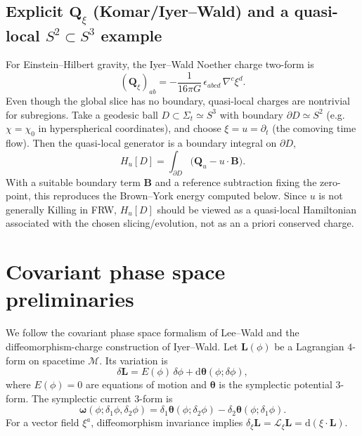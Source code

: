 \documentclass[
  reprint,
  amsmath,amssymb,
  aps,
  prd,
  superscriptaddress,
  nofootinbib,
  longbibliography
]{revtex4-2}
\newcommand{\dd}{\mathrm{d}}
\newcommand{\M}{\mathcal{M}}
\newcommand{\Lie}{\mathcal{L}}
\newcommand{\Lform}{\bm{L}}
\newcommand{\tht}{\bm{\theta}}
\newcommand{\om}{\bm{\omega}}
\newcommand{\Q}{\bm{Q}}
\newcommand{\Bnd}{\bm{B}}
\begin{document}
\subsection{Explicit \texorpdfstring{$\Q_\xi$}{Q_xi} (Komar/Iyer--Wald) and a quasi-local \texorpdfstring{$S^2\subset S^3$}{S2 subset S3} example}
For Einstein--Hilbert gravity, the Iyer--Wald Noether charge two-form is
\begin{equation}
(\Q_\xi)_{ab}=-\frac{1}{16\pi G}\,\epsilon_{abcd}\,\nabla^c\xi^d.
\label{eq:QEH}
\end{equation}
Even though the global slice has no boundary, quasi-local charges are nontrivial for subregions.
Take a geodesic ball $D\subset\Sigma_t\simeq S^{3}$ with boundary $\partial D\simeq S^{2}$ (e.g.\ $\chi=\chi_0$ in hyperspherical coordinates), and choose $\xi=u=\partial_t$ (the comoving time flow).
Then the quasi-local generator is a boundary integral on $\partial D$,
\begin{equation}
H_u[D] = \int_{\partial D}\bigl(\Q_u-u\cdot \Bnd\bigr).
\end{equation}
With a suitable boundary term $\Bnd$ and a reference subtraction fixing the zero-point, this reproduces the Brown--York energy computed below.
Since $u$ is not generally Killing in FRW, $H_u[D]$ should be viewed as a quasi-local Hamiltonian associated with the chosen slicing/evolution, not as an a priori conserved charge.
\section{Covariant phase space preliminaries}
We follow the covariant phase space formalism of Lee--Wald and the diffeomorphism-charge construction of Iyer--Wald.\cite{LeeWald1990,IyerWald1994}
Let $\Lform(\phi)$ be a Lagrangian $4$-form on spacetime $\M$.
Its variation is
\begin{equation}
\delta\Lform = E(\phi)\,\delta\phi + \dd\tht(\phi;\delta\phi),
\end{equation}
where $E(\phi)=0$ are equations of motion and $\tht$ is the symplectic potential $3$-form.
The symplectic current $3$-form is
\begin{equation}
\om(\phi;\delta_1\phi,\delta_2\phi)=\delta_1\tht(\phi;\delta_2\phi)-\delta_2\tht(\phi;\delta_1\phi).
\end{equation}
For a vector field $\xi^{a}$, diffeomorphism invariance implies $\delta_\xi\Lform=\Lie_\xi\Lform=\dd(\xi\cdot\Lform)$.
\end{document}
